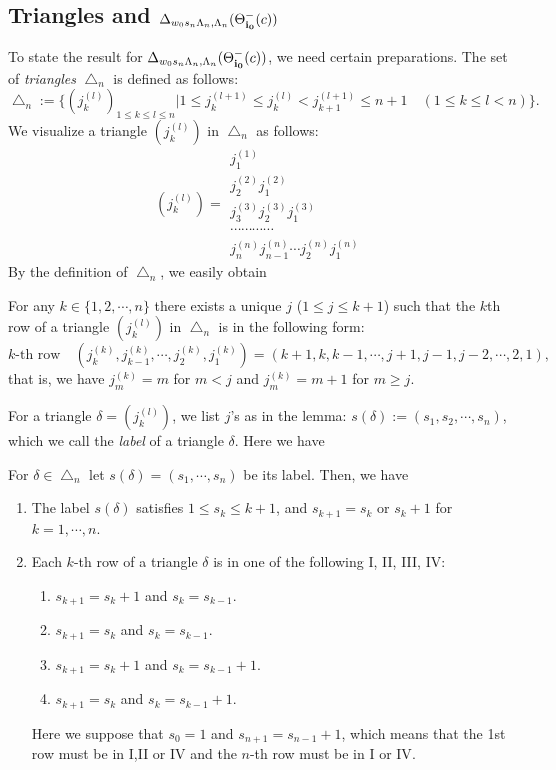 \subsection{Triangles and ${\Delta}_{w_0s_n{\Lambda}_n,{\Lambda}_n}(\Theta^-_\bfii0(c))$}
\label{Bn-del-n}
To state the result for ${\Delta}_{w_0s_n{\Lambda}_n,{\Lambda}_n}(\Theta^-_\bfii0(c))$,
we need certain preparations.
The set of {\it triangles} ${\bigtriangleup}_n$ is defined as follows:
\begin{equation}
{\bigtriangleup}_n:=\{{({j_{k}^{(l)}})}_{1\leq k\leq l\leq n}|
1\leq {j_{k}^{(l+1)}}\leq {j_{k}^{(l)}}<{j_{k+1}^{(l+1)}}\leq n+1
{\quad}(1\leq k\leq l<n)\}.
\end{equation}
We visualize a triangle $({j_{k}^{(l)}})$ in ${\bigtriangleup}_n$ as follows:
\[({j_{k}^{(l)}})=
 \begin{array}{c}
{j_{1}^{(1)}}\\
{j_{2}^{(2)}}{j_{1}^{(2)}}\\
{j_{3}^{(3)}}{j_{2}^{(3)}}{j_{1}^{(3)}}\\
{\cdots}{\cdots}{\cdots}{\cdots}\\
{j_{n}^{(n)}}{j_{n-1}^{(n)}}{\cdots}{j_{2}^{(n)}}{j_{1}^{(n)}}
\end{array}
\]
By the definition of ${\bigtriangleup}_n$, we easily obtain 
\begin{lem}
For any $k\in\{1,2,{\cdots},n\}$ there exists a unique $j$
($1\leq j\leq k+1$) such that the $k$th row of 
a triangle $({j_{k}^{(l)}})$ in ${\bigtriangleup}_n$ is in the following form:
\begin{equation}
k\text{-th row}{\quad}
({j_{k}^{(k)}},{j_{k-1}^{(k)}},{\cdots},{j_{2}^{(k)}},{j_{1}^{(k)}})
=(k+1, k,k-1,{\cdots},j+1,j-1,j-2,{\cdots},2,1),
\end{equation}
that is, we have ${j_{m}^{(k)}}=m$ for $m<j$ and 
${j_{m}^{(k)}}=m+1$ for $m\geq j$.
\end{lem}
For a triangle ${\delta}=({j_{k}^{(l)}})$, we list $j$'s as in the lemma:
$s({\delta}):=(s_1,s_2,{\cdots},s_n)$, which we call the {\it label} of 
a triangle ${\delta}$.
Here we have
\begin{lem}\label{s4}
For ${\delta}\in{\bigtriangleup}_n$ let $s({\delta})=(s_1,{\cdots},s_n)$ be its label. 
Then, we have
\begin{enumerate}
\item
The label $s({\delta})$  satisfies 
$1\leq s_k\leq k+1$,
and $s_{k+1}=s_{k}$ or $s_{k}+1$ for $k=1,{\cdots},n$.
\item
Each  $k$-th row of a triangle ${\delta}$ is in 
one of the following {\rm I, II, III, IV:}
\begin{enumerate}[\rm I.]
\item $s_{k+1}=s_k+1$ and $s_k=s_{k-1}$.
\item $s_{k+1}=s_k$ and $s_k=s_{k-1}$.
\item $s_{k+1}=s_k+1$ and $s_k=s_{k-1}+1$.
\item $s_{k+1}=s_k$ and $s_k=s_{k-1}+1$.
\end{enumerate}
Here we suppose that $s_0=1$ and $s_{n+1}=s_{n-1}+1$, which means that 
the 1st row must be in {\rm I,II or IV} 
and the $n$-th row must be in {\rm I or IV}.
\end{enumerate}
\end{lem}
